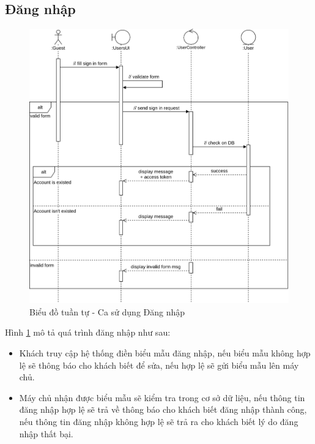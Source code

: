 \documentclass[./../main.tex]{subfiles}
\begin{document}
\subsection{Đăng nhập}
\begin{figure}[H]
	\centering
	\includegraphics[width=\linewidth]{./img/uc2.png}
	\caption{\label{tab:seq-uc2}Biểu đồ tuần tự - Ca sử dụng Đăng nhập}
\end{figure}
Hình \ref{tab:seq-uc2} mô tả quá trình đăng nhập như sau:
\begin{itemize}
    \item Khách truy cập hệ thống điền biểu mẫu đăng nhập, nếu biểu mẫu không hợp lệ sẽ thông báo cho khách biết để sửa, nếu hợp lệ sẽ gửi biểu mẫu lên máy chủ.
    \item Máy chủ nhận được biểu mẫu sẽ kiểm tra trong cơ sở dữ liệu, nếu thông tin đăng nhập hợp lệ sẽ trả về thông báo cho khách biết đăng nhập thành công, nếu thông tin đăng nhập không hợp lệ sẽ trả ra cho khách biết lý do đăng nhập thất bại.
\end{itemize}
\end{document}
